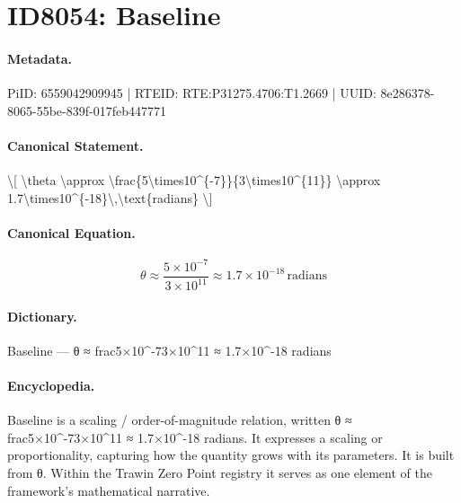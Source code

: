 \section*{ID8054: Baseline}
\paragraph{Metadata.}
PiID: 6559042909945 | RTEID: RTE:P31275.4706:T1.2669 | UUID: 8e286378-8065-55be-839f-017feb447771

\paragraph{Canonical Statement.}
\textbackslash{}[ \textbackslash{}theta \textbackslash{}approx \textbackslash{}frac\{5\textbackslash{}times10\textasciicircum{}\{-7\}\}\{3\textbackslash{}times10\textasciicircum{}\{11\}\} \textbackslash{}approx 1.7\textbackslash{}times10\textasciicircum{}\{-18\}\textbackslash{},\textbackslash{}text\{radians\} \textbackslash{}]

\paragraph{Canonical Equation.}
\[
\theta \approx \frac{5\times10^{-7}}{3\times10^{11}} \approx 1.7\times10^{-18}\,\text{radians}
\]

\paragraph{Dictionary.}
Baseline — θ ≈ frac5×10\textasciicircum{}-73×10\textasciicircum{}11 ≈ 1.7×10\textasciicircum{}-18 radians

\paragraph{Encyclopedia.}
Baseline is a scaling / order-of-magnitude relation, written θ ≈ frac5×10\textasciicircum{}-73×10\textasciicircum{}11 ≈ 1.7×10\textasciicircum{}-18 radians. It expresses a scaling or proportionality, capturing how the quantity grows with its parameters. It is built from θ. Within the Trawin Zero Point registry it serves as one element of the framework's mathematical narrative.
